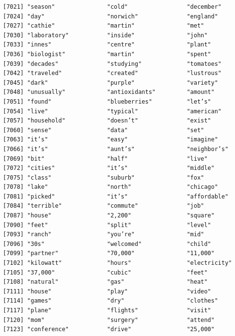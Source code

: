 \documentclass[
  letterpaper,
  DIV=11,
  numbers=noendperiod]{scrartcl}
\begin{document}
\begin{verbatim}
[7021] "season"               "cold"                 "december"            
[7024] "day"                  "norwich"              "england"             
[7027] "cathie"               "martin"               "met"                 
[7030] "laboratory"           "inside"               "john"                
[7033] "innes"                "centre"               "plant"               
[7036] "biologist"            "martin"               "spent"               
[7039] "decades"              "studying"             "tomatoes"            
[7042] "traveled"             "created"              "lustrous"            
[7045] "dark"                 "purple"               "variety"             
[7048] "unusually"            "antioxidants"         "amount"              
[7051] "found"                "blueberries"          "let’s"               
[7054] "live"                 "typical"              "american"            
[7057] "household"            "doesn’t"              "exist"               
[7060] "sense"                "data"                 "set"                 
[7063] "it’s"                 "easy"                 "imagine"             
[7066] "it’s"                 "aunt’s"               "neighbor’s"          
[7069] "bit"                  "half"                 "live"                
[7072] "cities"               "it’s"                 "middle"              
[7075] "class"                "suburb"               "fox"                 
[7078] "lake"                 "north"                "chicago"             
[7081] "picked"               "it’s"                 "affordable"          
[7084] "terrible"             "commute"              "job"                 
[7087] "house"                "2,200"                "square"              
[7090] "feet"                 "split"                "level"               
[7093] "ranch"                "you’re"               "mid"                 
[7096] "30s"                  "welcomed"             "child"               
[7099] "partner"              "70,000"               "11,000"              
[7102] "kilowatt"             "hours"                "electricity"         
[7105] "37,000"               "cubic"                "feet"                
[7108] "natural"              "gas"                  "heat"                
[7111] "house"                "play"                 "video"               
[7114] "games"                "dry"                  "clothes"             
[7117] "plane"                "flights"              "visit"               
[7120] "mom"                  "surgery"              "attend"              
[7123] "conference"           "drive"                "25,000"              

\end{verbatim}
\end{document}
